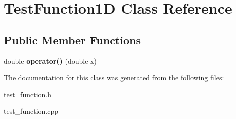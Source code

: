 \hypertarget{class_test_function1_d}{}\section{Test\+Function1\+D Class Reference}
\label{class_test_function1_d}
\subsection*{Public Member Functions}
\begin{DoxyCompactItemize}
\item 
\hypertarget{class_test_function1_d_a255ac61dd1b892a50ae9e815d8b73260}{}double {\bfseries operator()} (double x)\label{class_test_function1_d_a255ac61dd1b892a50ae9e815d8b73260}

\end{DoxyCompactItemize}


The documentation for this class was generated from the following files\+:\begin{DoxyCompactItemize}
\item 
test\+\_\+function.\+h\item 
test\+\_\+function.\+cpp\end{DoxyCompactItemize}

